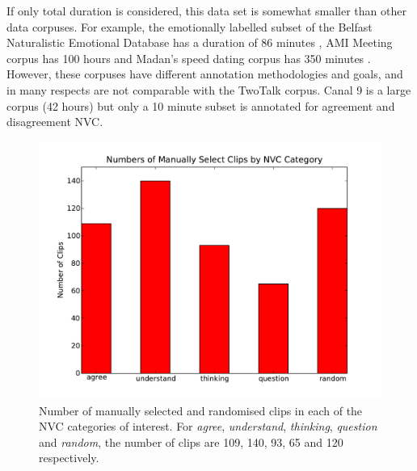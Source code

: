 If only total duration is considered, this data set is somewhat smaller than other data corpuses. For example, the emotionally labelled subset of the Belfast Naturalistic Emotional Database has a duration of 86 minutes \cite{DouglasCowie2003}, AMI Meeting corpus has 100 hours \cite{Carletta2007} and Madan's speed dating corpus has 350 minutes \cite{Madan2003}. However, these corpuses have different annotation methodologies and goals, and in many respects are not comparable with the TwoTalk corpus. Canal 9 is a large corpus (42 hours) but only a 10 minute subset is annotated for agreement and disagreement \ac{NVC}.


\begin{figure}
\centering
\includegraphics[width = 0.60 \columnwidth]{corpus/FigureManuallySelectedClips.pdf}
\caption[Number of manually selected and randomised clips in each of the NVC categories of interest.]{Number of manually selected and randomised clips in each of the NVC categories of interest. For \textit{agree}, \textit{understand}, \textit{thinking}, \textit{question} and \textit{random}, the number of clips are 109, 140, 93, 65 and 120 respectively.}
\label{FigureManuallySelectedClips}
\end{figure}



